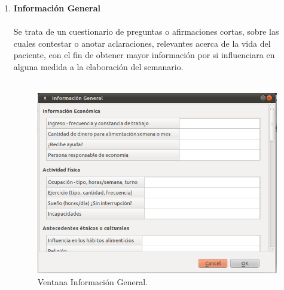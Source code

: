 \begin{enumerate}
\item \textbf{Información General}\\\\
Se trata de un cuestionario de preguntas o afirmaciones cortas, sobre las cuales contestar o anotar aclaraciones, relevantes acerca de la vida del paciente, con el fin de obtener mayor información por si influenciara en alguna medida a la elaboración del semanario.\\\\
\begin{figure}[H]
  \label{infogen}
  \begin{center}
    \includegraphics[scale=0.5]{../../Image/infogen.png}
  \end{center}
  \caption{Ventana Información General.}
\end{figure}


\end{enumerate}
